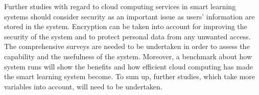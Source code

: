 \documentclass[journal]{vgtc}
\begin{document}
Further studies with regard to cloud computing services in smart learning systems should consider security as an important issue as users' information are stored in the system. Encryption can be taken into account for improving the security of the system and to protect personal data from any unwanted access. The comprehensive surveys are needed to be undertaken in order to assess the capability and the usefulness of the system. Moreover, a benchmark about how system runs will show the benefits and how efficient cloud computing has made the smart learning system become. To sum up, further studies, which take more variables into account, will need to be undertaken.




\end{document}
